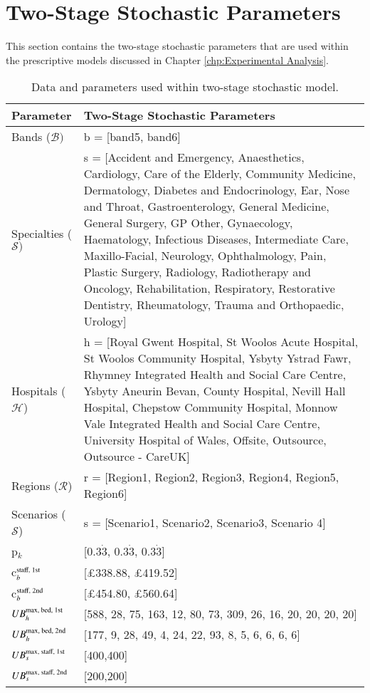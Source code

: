 \documentclass[thesis.tex]{subfiles}
\begin{document}
\section{Two-Stage Stochastic Parameters}
This section contains the two-stage stochastic parameters that are used within the prescriptive models discussed in Chapter \ref{chp:Experimental Analysis}.
\begin{landscape}

{\scriptsize
\begin{longtable}{lp{17cm}}
    \label{tab:appstochpa}
\captionsetup{singlelinecheck=false}
\caption{Data and parameters used within two-stage stochastic model.}\hline
        \textbf{Parameter} & \textbf{Two-Stage Stochastic Parameters} \\ \midrule
        Bands ($\mathcal{B})$ & b = [band5, band6]\\  \midrule
        Specialties ($\mathcal{S})$ & s = [Accident and Emergency, Anaesthetics, Cardiology, Care of the Elderly, Community Medicine, Dermatology, Diabetes and Endocrinology, Ear, Nose and Throat, Gastroenterology, General Medicine, General Surgery, GP Other, Gynaecology, Haematology, Infectious Diseases, Intermediate Care, Maxillo-Facial, Neurology, Ophthalmology, Pain, Plastic Surgery, Radiology, Radiotherapy and Oncology, Rehabilitation, Respiratory, Restorative Dentistry, Rheumatology, Trauma and Orthopaedic, Urology]\\\midrule
        Hospitals ($\mathcal{H}$) & h = [Royal Gwent Hospital, St Woolos Acute Hospital, St Woolos Community Hospital, Ysbyty Ystrad Fawr, Rhymney Integrated Health and Social Care Centre, Ysbyty Aneurin Bevan, County Hospital, Nevill Hall Hospital, Chepstow Community Hospital, Monnow Vale Integrated Health and Social Care Centre, University Hospital of Wales, Offsite, Outsource, Outsource - CareUK] \\\midrule
        Regions ($\mathcal{R}$) & r = [Region1, Region2, Region3, Region4, Region5, Region6]\\\midrule
        Scenarios ($\mathcal{S}$) & s = [Scenario1, Scenario2, Scenario3, Scenario 4]\\\midrule
        p$_{k}$ & [0.3$\dot{3}$, 0.3$\dot{3}$, 0.3$\dot{3}$] \\\midrule
        c$^\textnormal{staff, 1st}_{b}$ & [$\pounds$338.88,	$\pounds$419.52]\\\midrule
        c$^\textnormal{staff, 2nd}_{b}$ & [$\pounds$454.80,	$\pounds$560.64] \\\midrule
        $UB^\textnormal{max, bed, 1st}_{h}$ & [588, 28, 75, 163, 12, 80, 73, 309, 26, 16, 20, 20, 20, 20]	   \\\midrule
        $UB^\textnormal{max, bed, 2nd}_{h}$ & [177, 9, 28, 49, 4, 24, 22, 93, 8, 5, 6, 6, 6, 6]	\\\midrule
        $UB^\textnormal{max, staff, 1st}_{s}$ & [400,400]	   \\\midrule
        $UB^\textnormal{max, staff, 2nd}_{s}$ & [200,200]	 \\\hline
               

\end{longtable}}
\end{landscape}
\end{document}
